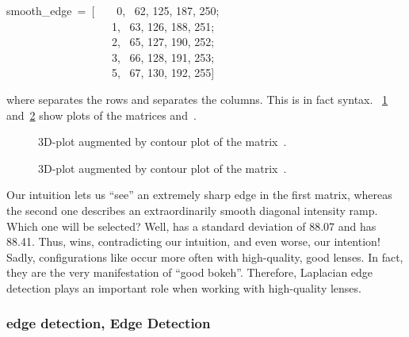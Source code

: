 \begin{literal}
  smooth\_edge~=~[~~~~0,  ~62,  125,  187,  250; \\
    ~~~~~~~~~~~~~~~~~~~1,  ~63,  126,  188,  251; \\
    ~~~~~~~~~~~~~~~~~~~2,  ~65,  127,  190,  252; \\
    ~~~~~~~~~~~~~~~~~~~3,  ~66,  128,  191,  253; \\
    ~~~~~~~~~~~~~~~~~~~5,  ~67,  130,  192,  255]
\end{literal}

\noindent where \sample{;} separates the rows and \sample{,} separates the columns.  This is in
fact  syntax.  \figureName~\ref{fig:sharp-edge}
and~\ref{fig:smooth-edge} show plots of the matrices  and~.


\begin{figure}
  \begin{maxipage}
    \centering
  \end{maxipage}

  \caption[Sharp edge]{\label{fig:sharp-edge}%
    3D-plot augmented by contour plot of the matrix~.}
\end{figure}


\begin{figure}
  \begin{maxipage}
    \centering
  \end{maxipage}

  \caption[Smooth edge]{\label{fig:smooth-edge}%
    3D-plot augmented by contour plot of the matrix~.}
\end{figure}


Our intuition lets us ``see'' an extremely sharp edge in the first matrix, whereas the second
one describes an extraordinarily smooth diagonal intensity ramp.  Which one will be selected?
Well,  has a standard deviation of 88.07 and  has 88.41.
Thus,  wins, contradicting our intuition, and even worse, our intention!
Sadly, configurations like  occur more often with high-quality, good
 lenses.  In fact, they are the very manifestation of
``good bokeh''.  Therefore, Laplacian edge detection plays an important role when working with
high-quality lenses.


\subsubsection[\propername{Laplacian} Edge Detection]{\label{sec:laplacian-edge-detection}%
         {edge detection, }%
   Edge Detection}

